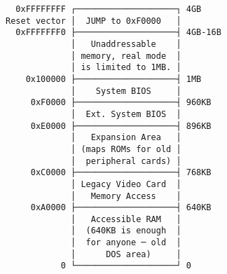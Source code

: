 \documentclass[varwidth]{standalone}
\begin{document}
\begin{verbatim}
  0xFFFFFFFF ┌────────────────────┐ 4GB
Reset vector │  JUMP to 0xF0000   │
  0xFFFFFFF0 ├────────────────────┤ 4GB-16B
             │   Unaddressable    │
             │ memory, real mode  │
             │ is limited to 1MB. │
    0x100000 ├────────────────────┤ 1MB
             │    System BIOS     │
     0xF0000 ├────────────────────┤ 960KB
             │  Ext. System BIOS  │
     0xE0000 ├────────────────────┤ 896KB
             │   Expansion Area   │
             │ (maps ROMs for old │
             │  peripheral cards) │
     0xC0000 ├────────────────────┤ 768KB
             │ Legacy Video Card  │
             │   Memory Access    │
     0xA0000 ├────────────────────┤ 640KB
             │   Accessible RAM   │
             │  (640KB is enough  │
             │  for anyone ─ old  │
             │      DOS area)     │
           0 └────────────────────┘ 0
\end{verbatim}
\end{document}
